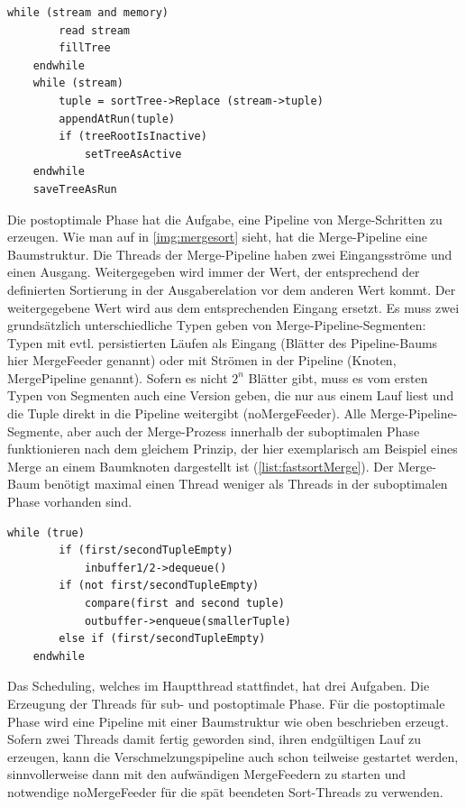 \documentclass[a4paper,12pt,twoside]{article}
\begin{document}
\begin{minipage}{\linewidth}
	\begin{lstlisting}[caption={Fastsort: Erzeugen der Runs in der Suboptimalen Phase}, label=list:fastsortSub] 
	while (stream and memory) 
		read stream
		fillTree
	endwhile
	while (stream)
		tuple = sortTree->Replace (stream->tuple)
		appendAtRun(tuple)
		if (treeRootIsInactive)
			setTreeAsActive
	endwhile
	saveTreeAsRun
	\end{lstlisting}
\end{minipage}

Die postoptimale Phase hat die Aufgabe, eine Pipeline von Merge-Schritten zu erzeugen. Wie man auf in \autoref{img:mergesort} sieht, hat die Merge-Pipeline eine Baumstruktur. Die Threads der Merge-Pipeline haben zwei Eingangsströme und einen Ausgang. Weitergegeben wird immer der Wert, der entsprechend der definierten Sortierung in der Ausgaberelation vor dem anderen Wert kommt. Der weitergegebene Wert wird aus dem entsprechenden Eingang ersetzt. Es muss zwei grundsätzlich unterschiedliche Typen geben von Merge-Pipeline-Segmenten: Typen mit evtl. persistierten Läufen als Eingang (Blätter des Pipeline-Baums hier MergeFeeder genannt) oder mit Strömen in der Pipeline (Knoten, MergePipeline genannt). Sofern es nicht $2^n$ Blätter gibt, muss es vom ersten Typen von Segmenten auch eine Version geben, die nur aus einem Lauf liest und die Tuple direkt in die Pipeline weitergibt (noMergeFeeder). Alle Merge-Pipeline-Segmente, aber auch der Merge-Prozess innerhalb der suboptimalen Phase funktionieren nach dem gleichem Prinzip, der hier exemplarisch am Beispiel eines Merge an einem Baumknoten dargestellt ist (\autoref{list:fastsortMerge}). Der Merge-Baum benötigt maximal einen Thread weniger als Threads in der suboptimalen Phase vorhanden sind.

\begin{minipage}{\linewidth}
	\begin{lstlisting}[caption={Fastsort: Merge in Pipeline}, label=list:fastsortMerge] 
	while (true)
		if (first/secondTupleEmpty)
			inbuffer1/2->dequeue()
		if (not first/secondTupleEmpty)
			compare(first and second tuple)
			outbuffer->enqueue(smallerTuple)
		else if (first/secondTupleEmpty)
	endwhile
	\end{lstlisting}
\end{minipage}

Das Scheduling, welches im Hauptthread stattfindet, hat drei Aufgaben. Die Erzeugung der Threads für sub- und postoptimale Phase. Für die postoptimale Phase wird eine Pipeline mit einer Baumstruktur wie oben beschrieben erzeugt. Sofern zwei Threads damit fertig geworden sind, ihren endgültigen Lauf zu erzeugen, kann die Verschmelzungspipeline auch schon teilweise gestartet werden, sinnvollerweise dann mit den aufwändigen MergeFeedern zu starten und notwendige noMergeFeeder für die spät beendeten Sort-Threads zu verwenden.
\end{document}
